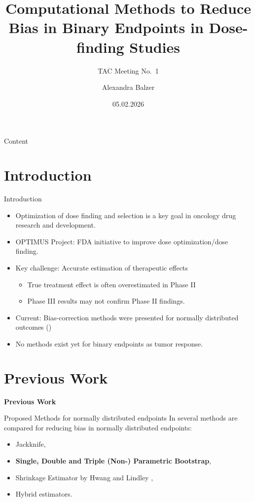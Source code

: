 \documentclass[
  ignorenonframetext,
  aspectratio=169]{beamer}
\title[Computational Methods to Reduce Bias in Binary Endpoints in
Dose-finding Studies]{Computational Methods to Reduce Bias in Binary
Endpoints in Dose-finding Studies}
\subtitle{TAC Meeting No.~1}
\author[Alexandra Balzer]{Alexandra Balzer}
\date{05.02.2026}
\institute{Institute of Medical Biometry \break University of
Heidelberg}
\providecommand{\tightlist}{%
  \setlength{\itemsep}{0pt}\setlength{\parskip}{0pt}}
\begin{document}
\frame[plain]{\titlepage}


\begin{frame}{Content}
\label{content}
\tableofcontents
\end{frame}

\section{Introduction}\label{introduction}

\begin{frame}{Introduction}
\label{introduction-1}
\begin{itemize}
\tightlist
\item
  Optimization of dose finding and selection is a key goal in oncology
  drug research and development.
\item
  OPTIMUS Project: FDA initiative to improve dose optimization/dose
  finding.
\item
  Key challenge: Accurate estimation of therapeutic effects

  \begin{itemize}
  \tightlist
  \item
    True treatment effect is often overestimated in Phase II
  \item
    Phase III results may not confirm Phase II findings.
  \end{itemize}
\item
  Current: Bias-correction methods were presented for normally
  distributed outcomes (\citep{tianyu2024})
\item
  No methods exist yet for binary endpoints as tumor response.
\end{itemize}
\end{frame}

\section{Previous Work}\label{previous-work}

\begin{frame}
\textcolor{uniblue}{\Huge \textbf{Previous Work}}
\end{frame}

\begin{frame}{Proposed Methods for normally distributed endpoints}
\label{proposed-methods-for-normally-distributed-endpoints}
In \citep{tianyu2024} several methods are compared for reducing bias in
normally distributed endpoints:

\begin{itemize}
\tightlist
\item
  Jackknife,
\item
  \textbf{Single, Double and Triple (Non-) Parametric Bootstrap},
\item
  Shrinkage Estimator by Hwang \citep{Hwang} and Lindley \citep{Lindey},
\item
  Hybrid estimators.
\end{itemize}
\end{frame}
\end{document}

